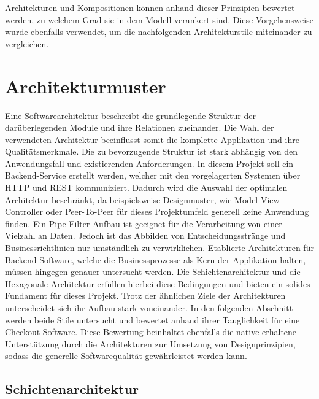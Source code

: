 Architekturen und Kompositionen können anhand dieser Prinzipien bewertet werden, zu welchem Grad sie in dem Modell verankert sind. Diese Vorgehensweise wurde ebenfalls verwendet, um die nachfolgenden Architekturstile miteinander zu vergleichen. 

\section{Architekturmuster}


Eine Softwarearchitektur beschreibt die grundlegende Struktur der darüberlegenden Module und ihre Relationen zueinander. Die Wahl der verwendeten Architektur beeinflusst somit die komplette Applikation und ihre Qualitätsmerkmale. Die zu bevorzugende Struktur ist stark abhängig von den Anwendungsfall und existierenden Anforderungen. In diesem Projekt soll ein Backend-Service erstellt werden, welcher mit den vorgelagerten Systemen über HTTP und REST kommuniziert. Dadurch wird die Auswahl der optimalen Architektur beschränkt, da beispielsweise Designmuster, wie Model-View-Controller oder Peer-To-Peer für dieses Projektumfeld generell keine Anwendung finden.  Ein Pipe-Filter Aufbau ist geeignet für die Verarbeitung von einer Vielzahl an Daten. Jedoch ist das Abbilden von Entscheidungsstränge und Businessrichtlinien nur umständlich zu verwirklichen. Etablierte Architekturen für Backend-Software, welche die Businessprozesse als Kern der Applikation halten, müssen hingegen genauer untersucht werden. Die Schichtenarchitektur und die Hexagonale Architektur erfüllen hierbei diese Bedingungen und bieten ein solides Fundament für dieses Projekt. Trotz der ähnlichen Ziele der Architekturen unterscheidet sich ihr Aufbau stark voneinander. In den folgenden Abschnitt werden beide Stile untersucht und bewertet anhand ihrer Tauglichkeit für eine Checkout-Software. Diese Bewertung beinhaltet ebenfalls die native erhaltene Unterstützung durch die Architekturen zur Umsetzung von Designprinzipien, sodass die generelle Softwarequalität gewährleistet werden kann. 

\subsection{Schichtenarchitektur}


